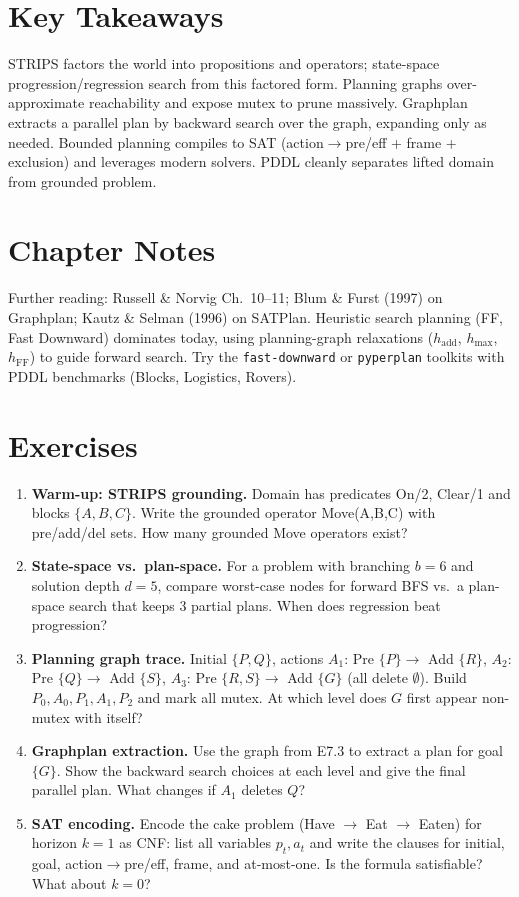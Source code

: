 \section{Key Takeaways}
STRIPS factors the world into propositions and operators; state-space progression/regression search from this factored form. Planning graphs over-approximate reachability and expose mutex to prune massively. Graphplan extracts a parallel plan by backward search over the graph, expanding only as needed. Bounded planning compiles to SAT (action$\to$pre/eff + frame + exclusion) and leverages modern solvers. PDDL cleanly separates lifted domain from grounded problem.

\section{Chapter Notes}
Further reading: Russell \& Norvig Ch.~10--11; Blum \& Furst (1997) on Graphplan; Kautz \& Selman (1996) on SATPlan. Heuristic search planning (FF, Fast Downward) dominates today, using planning-graph relaxations ($h_{\text{add}}$, $h_{\max}$, $h_{\text{FF}}$) to guide forward search. Try the \texttt{fast-downward} or \texttt{pyperplan} toolkits with PDDL benchmarks (Blocks, Logistics, Rovers).

\section{Exercises}
\label{sec:ch07-ex}
\begin{enumerate}[label=E7.\arabic*, leftmargin=*, itemsep=0.75em]
    \item \textbf{Warm-up: STRIPS grounding.} Domain has predicates On/2, Clear/1 and blocks $\{A,B,C\}$. Write the grounded operator Move(A,B,C) with pre/add/del sets. How many grounded Move operators exist?
    \item \textbf{State-space vs.\ plan-space.} For a problem with branching $b=6$ and solution depth $d=5$, compare worst-case nodes for forward BFS vs.\ a plan-space search that keeps 3 partial plans. When does regression beat progression?
    \item \textbf{Planning graph trace.} Initial $\{P,Q\}$, actions $A_1$: Pre $\{P\}\to$ Add $\{R\}$, $A_2$: Pre $\{Q\}\to$ Add $\{S\}$, $A_3$: Pre $\{R,S\}\to$ Add $\{G\}$ (all delete $\emptyset$). Build $P_0,A_0,P_1,A_1,P_2$ and mark all mutex. At which level does $G$ first appear non-mutex with itself?
    \item \textbf{Graphplan extraction.} Use the graph from E7.3 to extract a plan for goal $\{G\}$. Show the backward search choices at each level and give the final parallel plan. What changes if $A_1$ deletes $Q$?
    \item \textbf{SAT encoding.} Encode the cake problem (Have $\to$ Eat $\to$ Eaten) for horizon $k=1$ as CNF: list all variables $p_t,a_t$ and write the clauses for initial, goal, action$\to$pre/eff, frame, and at-most-one. Is the formula satisfiable? What about $k=0$?
\end{enumerate}
